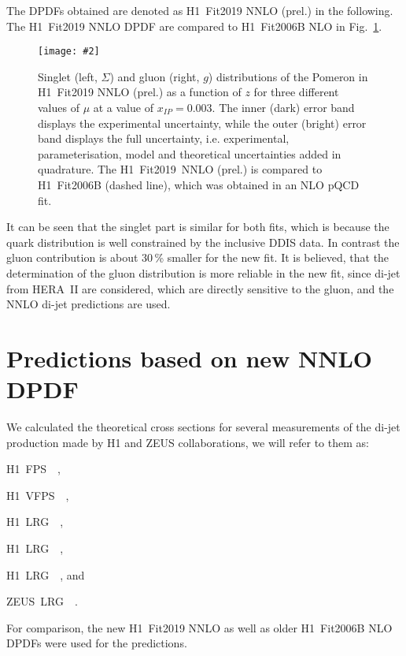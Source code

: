\documentclass{PoS}
\makeatletter
\newcommand{\IP}{I\!\!P}
\newcommand{\GeV}{\ensuremath{\mathrm{GeV}}\xspace}
\newcommand{\includegraphicss}[2][]{\texttt{[image: \#2]}}
\newcommand*{\rom}[1]{\expandafter\@slowromancap\romannumeral #1@}
\newcommand{\HERAI} {\protect\scalebox{0.8}{(HERA~\rom{1})}}
\newcommand{\HERAII} {\protect\scalebox{0.8}{(HERA~\rom{2})}}
\newcommand{\LowEP} {\protect\scalebox{0.8}{($300\,\GeV$)}}
\newcommand{\HLRG}  {H1~LRG~\HERAII\xspace}
\newcommand{\HVFPS} {H1~VFPS~\HERAII\xspace}
\newcommand{\HFPS}  {H1~FPS~\HERAII\xspace}
\newcommand{\HLRGI} {H1~LRG~\HERAI\xspace}
\newcommand{\ZLRG}  {ZEUS~LRG~\HERAI\xspace}
\newcommand{\HLRGEp}{H1~LRG~\LowEP\xspace}
\makeatother
\begin{document}
The DPDFs obtained are denoted as H1~Fit2019 NNLO (prel.) in the following. The H1~Fit2019 NNLO DPDF are compared to H1~Fit2006B NLO \cite{Aktas:2006hy} in Fig.~\ref{figDPDF}.
\begin{figure}[tbhp]
\centering
\includegraphicss[trim={0cm 0.5cm 0 1.5cm},clip,width=.7\textwidth]{{{plots/H1prelim-19-013.fig1}}}
\caption{ Singlet (left, $\Sigma$) and gluon (right, $g$) distributions of the Pomeron in H1~Fit2019 NNLO (prel.) as a function of $z$ for three different values of $\mu$ at a value of $x_{\IP} = 0.003$. The inner (dark) error band displays the experimental uncertainty, while the outer (bright) error band displays the full uncertainty, i.e. experimental, parameterisation, model and theoretical uncertainties added in quadrature. The H1~Fit2019~NNLO (prel.) is compared to H1~Fit2006B (dashed line), which was obtained in an NLO pQCD fit.}
\label{figDPDF}
\end{figure}
%
It can be seen that the singlet part is similar for both fits, which is because the quark distribution is well constrained by the inclusive DDIS data.
In contrast the gluon contribution is about 30\,\% smaller for the new fit. It is believed, that the determination of the gluon distribution is more reliable in the new fit, since di-jet from HERA~II are considered, which are directly sensitive to the gluon, and the NNLO di-jet predictions are used.


\section{Predictions based on new NNLO DPDF}

We calculated the theoretical cross sections for several measurements of the di-jet production made by H1 and ZEUS collaborations, we will refer to them as:
\begin{compactitem}
\item \HFPS ~\cite{Aaron:2011mp},
\item \HVFPS~\cite{Andreev:2015cwa},
\item \HLRG ~\cite{Andreev:2014yra},
\item \HLRGI~\cite{Aktas:2007bv},
\item\HLRGEp~\cite{Aktas:2007hn}, and
\item\ZLRG~\cite{Chekanov:2007aa}.
\end{compactitem}
%
For comparison, the new H1~Fit2019 NNLO as well as older H1~Fit2006B NLO DPDFs \cite{Aktas:2006hy} were used for the predictions.
\end{document}
